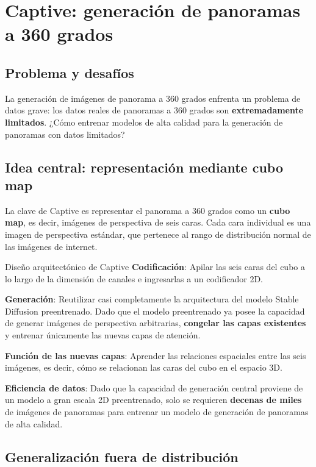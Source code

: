 \documentclass[a4paper]{article}
\begin{document}
\section{Captive: generación de panoramas a 360 grados}

\subsection{Problema y desafíos}

La generación de imágenes de panorama a 360 grados enfrenta un problema de datos grave: los datos reales de panoramas a 360 grados son \textbf{extremadamente limitados}. ¿Cómo entrenar modelos de alta calidad para la generación de panoramas con datos limitados?

\subsection{Idea central: representación mediante cubo map}

La clave de Captive es representar el panorama a 360 grados como un \textbf{cubo map}, es decir, imágenes de perspectiva de seis caras. Cada cara individual es una imagen de perspectiva estándar, que pertenece al rango de distribución normal de las imágenes de internet.

\begin{importantbox}{Diseño arquitectónico de Captive}
\textbf{Codificación}: Apilar las seis caras del cubo a lo largo de la dimensión de canales e ingresarlas a un codificador 2D.

\textbf{Generación}: Reutilizar casi completamente la arquitectura del modelo Stable Diffusion preentrenado. Dado que el modelo preentrenado ya posee la capacidad de generar imágenes de perspectiva arbitrarias, \textbf{congelar las capas existentes} y entrenar únicamente las nuevas capas de atención.

\textbf{Función de las nuevas capas}: Aprender las relaciones espaciales entre las seis imágenes, es decir, cómo se relacionan las caras del cubo en el espacio 3D.

\textbf{Eficiencia de datos}: Dado que la capacidad de generación central proviene de un modelo a gran escala 2D preentrenado, solo se requieren \textbf{decenas de miles} de imágenes de panoramas para entrenar un modelo de generación de panoramas de alta calidad.
\end{importantbox}

\subsection{Generalización fuera de distribución}
\end{document}
